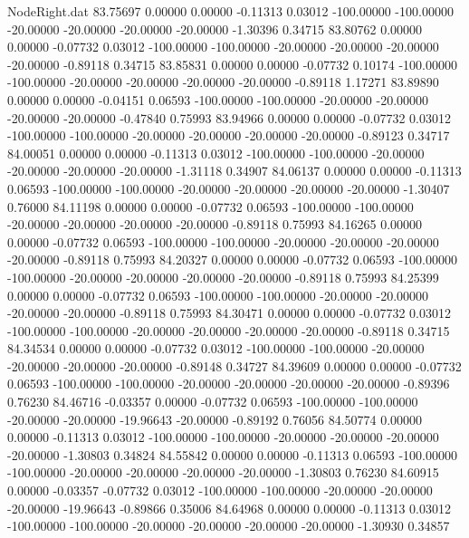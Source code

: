 \begin{filecontents}{NodeRight.dat}
  83.75697    0.00000    0.00000    -0.11313    0.03012 -100.00000 -100.00000  -20.00000  -20.00000  -20.00000  -20.00000   -1.30396    0.34715
  83.80762    0.00000    0.00000    -0.07732    0.03012 -100.00000 -100.00000  -20.00000  -20.00000  -20.00000  -20.00000   -0.89118    0.34715
  83.85831    0.00000    0.00000    -0.07732    0.10174 -100.00000 -100.00000  -20.00000  -20.00000  -20.00000  -20.00000   -0.89118    1.17271
  83.89890    0.00000    0.00000    -0.04151    0.06593 -100.00000 -100.00000  -20.00000  -20.00000  -20.00000  -20.00000   -0.47840    0.75993
  83.94966    0.00000    0.00000    -0.07732    0.03012 -100.00000 -100.00000  -20.00000  -20.00000  -20.00000  -20.00000   -0.89123    0.34717
  84.00051    0.00000    0.00000    -0.11313    0.03012 -100.00000 -100.00000  -20.00000  -20.00000  -20.00000  -20.00000   -1.31118    0.34907
  84.06137    0.00000    0.00000    -0.11313    0.06593 -100.00000 -100.00000  -20.00000  -20.00000  -20.00000  -20.00000   -1.30407    0.76000
  84.11198    0.00000    0.00000    -0.07732    0.06593 -100.00000 -100.00000  -20.00000  -20.00000  -20.00000  -20.00000   -0.89118    0.75993
  84.16265    0.00000    0.00000    -0.07732    0.06593 -100.00000 -100.00000  -20.00000  -20.00000  -20.00000  -20.00000   -0.89118    0.75993
  84.20327    0.00000    0.00000    -0.07732    0.06593 -100.00000 -100.00000  -20.00000  -20.00000  -20.00000  -20.00000   -0.89118    0.75993
  84.25399    0.00000    0.00000    -0.07732    0.06593 -100.00000 -100.00000  -20.00000  -20.00000  -20.00000  -20.00000   -0.89118    0.75993
  84.30471    0.00000    0.00000    -0.07732    0.03012 -100.00000 -100.00000  -20.00000  -20.00000  -20.00000  -20.00000   -0.89118    0.34715
  84.34534    0.00000    0.00000    -0.07732    0.03012 -100.00000 -100.00000  -20.00000  -20.00000  -20.00000  -20.00000   -0.89148    0.34727
  84.39609    0.00000    0.00000    -0.07732    0.06593 -100.00000 -100.00000  -20.00000  -20.00000  -20.00000  -20.00000   -0.89396    0.76230
  84.46716   -0.03357    0.00000    -0.07732    0.06593 -100.00000 -100.00000  -20.00000  -20.00000  -19.96643  -20.00000   -0.89192    0.76056
  84.50774    0.00000    0.00000    -0.11313    0.03012 -100.00000 -100.00000  -20.00000  -20.00000  -20.00000  -20.00000   -1.30803    0.34824
  84.55842    0.00000    0.00000    -0.11313    0.06593 -100.00000 -100.00000  -20.00000  -20.00000  -20.00000  -20.00000   -1.30803    0.76230
  84.60915    0.00000   -0.03357    -0.07732    0.03012 -100.00000 -100.00000  -20.00000  -20.00000  -20.00000  -19.96643   -0.89866    0.35006
  84.64968    0.00000    0.00000    -0.11313    0.03012 -100.00000 -100.00000  -20.00000  -20.00000  -20.00000  -20.00000   -1.30930    0.34857

\end{filecontents}
